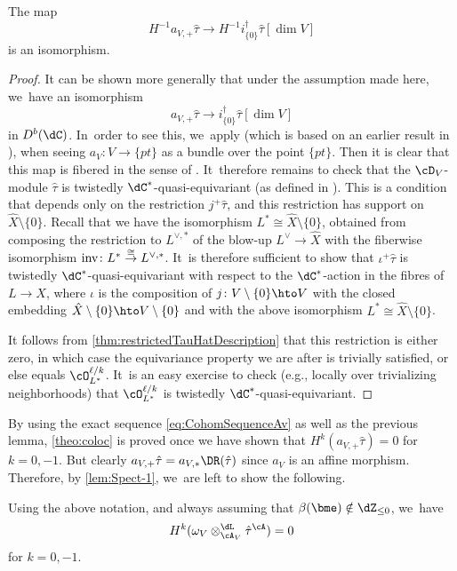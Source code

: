 \begin{lem}
The map
\[
H^{-1} a_{V,+} \hat\tau
\to H^{-1} i_{\{0\}}^\dag \hat\tau[\dim V]
\]
is an isomorphism.
\end{lem}

\begin{proof}
It can be shown more generally that under the assumption made here, we~have an isomorphism
\[
a_{V,+} \hat\tau
\to i_{\{0\}}^\dag \hat\tau[\dim V]
\]
in $D^b(\dC)$. In~order to see this, we~apply \cite[Lem.\,4.4]{AviDualProjRestrGKZ} (which is based on an earlier result in \cite[Lem.\,3.3]{ReichWalth-Duco}),
when seeing $a_V \colon V\to\{pt\}$ as a bundle over the point $\{pt\}$. Then it is clear that this map is fibered in the sense of \cite[Def.\,4.1]{AviDualProjRestrGKZ}. It~therefore remains to check that the $\cD_V$\nobreakdash-mod\-ule $\hat\tau$ is twistedly $\dC^*$-quasi-equivariant (as defined in \cite[Def.\,4.2]{AviDualProjRestrGKZ}). This is a condition that depends only on the restriction
$j^+\hat\tau$, and this restriction has support on $\hat{X}\setminus \{0\}$.
Recall that we have the isomorphism $L^* \cong \hat{X}\setminus\{0\}$, obtained from composing the restriction to $L^{\vee,*}$ of the blow-up $L^\vee \to \hat{X}$ with the fiberwise isomorphism $\textup{inv} \colon L^*\stackrel{\cong}{\to} L^{\vee,*}$. It~is therefore sufficient
to show that $\iota^+\hat{\tau}$ is
twistedly $\dC^*$-quasi-equivariant with respect to the
$\dC^*$-action in the fibres of $L\to X$, where $\iota$ is the composition of $j \colon V\setminus \{0\}\hto V$ with the closed embedding $\hat{X}\setminus\{0\}\hto V\setminus\{0\}$ and with the above isomorphism $L^{*}\cong \hat{X}\setminus\{0\}$.

It follows from \cref{thm:restrictedTauHatDescription} that this restriction is either zero, in which case the equivariance property we are after is trivially satisfied, or else equals $\cO_{L^*}^{\ell/k}$. It~is an easy exercise to check (e.g., locally over trivializing neighborhoods) that $\cO_{L^*}^{\ell/k}$ is
twistedly $\dC^*$-quasi-equivariant.
\end{proof}

By using the exact sequence \eqref{eq:CohomSequenceAv} as well as the previous lemma, \cref{theo:coloc} is proved once we have shown that $H^k(a_{V,+}\hat\tau)=0$ for $k=0,-1$. But clearly $a_{V,+}\hat\tau = a_{V,*}\DR(\hat\tau)$ since $a_V$ is an affine morphism. Therefore, by \cref{lem:Spect-1}, we~are left to show the following.

\begin{prop}\label{prop:VanishCohomA}
Using the above notation, and always assuming that
$\beta(\bme)\notin \dZ_{\leq 0}$, we~have
\[
H^k(\omega_V\otimes^\dL_{\cA_V}\hat{\tau}^\cA)=0
\]
for $k=0,-1$.
\end{prop}

